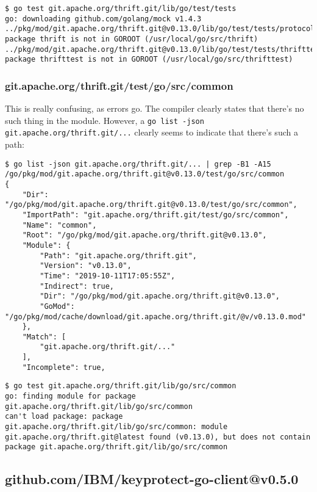 \documentclass[a4paper]{paper}
\begin{document}
\begin{verbatim}
$ go test git.apache.org/thrift.git/lib/go/test/tests
go: downloading github.com/golang/mock v1.4.3
../pkg/mod/git.apache.org/thrift.git@v0.13.0/lib/go/test/tests/protocol_mock.go:27:2: package thrift is not in GOROOT (/usr/local/go/src/thrift)
../pkg/mod/git.apache.org/thrift.git@v0.13.0/lib/go/test/tests/thrifttest_driver.go:25:2: package thrifttest is not in GOROOT (/usr/local/go/src/thrifttest)

\end{verbatim}

\subsubsection{git.apache.org/thrift.git/test/go/src/common}

This is really confusing, as errors go. The compiler clearly states that there's no such thing in the module. However, a {\tt go list -json git.apache.org/thrift.git/...} clearly seems to indicate that there's such a path:

\begin{verbatim}
$ go list -json git.apache.org/thrift.git/... | grep -B1 -A15 /go/pkg/mod/git.apache.org/thrift.git@v0.13.0/test/go/src/common
{
	"Dir": "/go/pkg/mod/git.apache.org/thrift.git@v0.13.0/test/go/src/common",
	"ImportPath": "git.apache.org/thrift.git/test/go/src/common",
	"Name": "common",
	"Root": "/go/pkg/mod/git.apache.org/thrift.git@v0.13.0",
	"Module": {
		"Path": "git.apache.org/thrift.git",
		"Version": "v0.13.0",
		"Time": "2019-10-11T17:05:55Z",
		"Indirect": true,
		"Dir": "/go/pkg/mod/git.apache.org/thrift.git@v0.13.0",
		"GoMod": "/go/pkg/mod/cache/download/git.apache.org/thrift.git/@v/v0.13.0.mod"
	},
	"Match": [
		"git.apache.org/thrift.git/..."
	],
	"Incomplete": true,
\end{verbatim}

\begin{verbatim}
$ go test git.apache.org/thrift.git/lib/go/src/common
go: finding module for package git.apache.org/thrift.git/lib/go/src/common
can't load package: package git.apache.org/thrift.git/lib/go/src/common: module git.apache.org/thrift.git@latest found (v0.13.0), but does not contain package git.apache.org/thrift.git/lib/go/src/common
\end{verbatim}

\subsection{github.com/IBM/keyprotect-go-client@v0.5.0}
\end{document}
